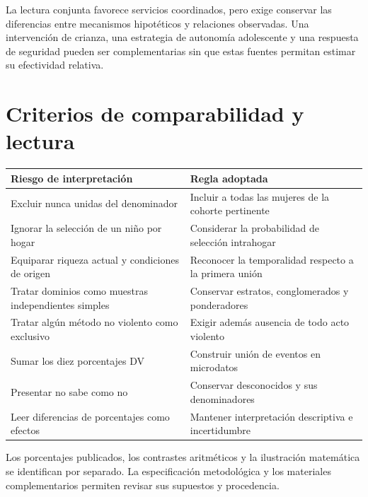 \documentclass[11pt,a4paper]{article}
\begin{document}
La lectura conjunta favorece servicios coordinados, pero exige conservar
las diferencias entre mecanismos hipotéticos y relaciones observadas. Una
intervención de crianza, una estrategia de autonomía adolescente y una
respuesta de seguridad pueden ser complementarias sin que estas fuentes
permitan estimar su efectividad relativa.

\noindent\begin{minipage}{\textwidth}
\section{Criterios de comparabilidad y lectura}
\begin{center}
\centering\small
{}\label{tab:correcciones}
\begin{tabularx}{\textwidth}{@{}YY@{}}\toprule
Riesgo de interpretación & Regla adoptada\\\midrule
Excluir nunca unidas del denominador & Incluir a todas las mujeres de la cohorte pertinente\\
Ignorar la selección de un niño por hogar & Considerar la probabilidad de selección intrahogar\\
Equiparar riqueza actual y condiciones de origen & Reconocer la temporalidad respecto a la primera unión\\
Tratar dominios como muestras independientes simples & Conservar estratos, conglomerados y ponderadores\\
Tratar algún método no violento como exclusivo & Exigir además ausencia de todo acto violento\\
Sumar los diez porcentajes DV & Construir unión de eventos en microdatos\\
Presentar no sabe como no & Conservar desconocidos y sus denominadores\\
Leer diferencias de porcentajes como efectos & Mantener interpretación descriptiva e incertidumbre\\\bottomrule
\end{tabularx}
\end{center}
\end{minipage}

Los porcentajes publicados, los contrastes aritméticos y la ilustración
matemática se identifican por separado. La especificación metodológica y
los materiales complementarios permiten revisar sus supuestos y procedencia.


\end{document}
